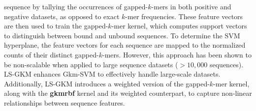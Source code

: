 \documentclass[a4paper, titlepage, openright]{book}
\begin{document}
sequence by tallying the occurrences of gapped-$k$-mers in both positive and negative datasets, as opposed to exact $k$-mer frequencies. These feature vectors are then used to train the gapped-$k$-mer kernel, which computes support vectors to distinguish between bound and unbound sequences. To determine the SVM hyperplane, the feature vectors for each sequence are mapped to the normalized counts of their distinct gapped-$k$-mers. However, this approach has been shown to be non-scalable when applied to large sequence datasets ($> 10,000$ sequences). LS-GKM \citep{lee2016ls} enhances Gkm-SVM to effectively handle large-scale datasets. Additionally, LS-GKM introduces a weighted version of the gapped-$k$-mer kernel, along with the \textbf{gkmrbf} kernel and its weighted counterpart, to capture non-linear relationships between sequence features.

\end{document}
